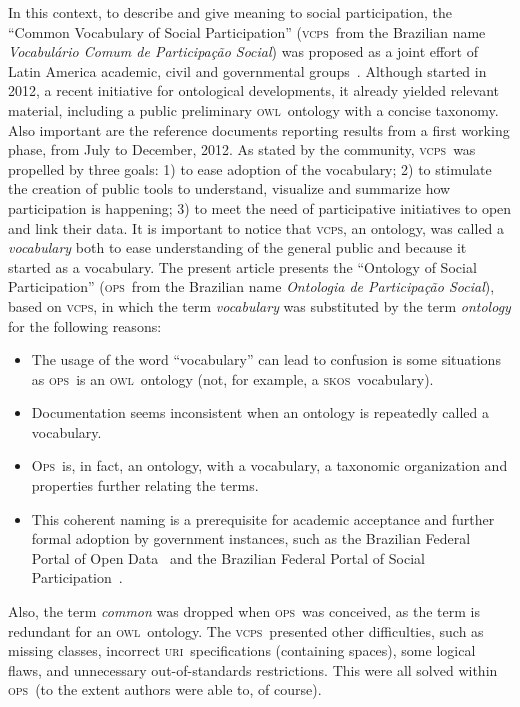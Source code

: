 \documentclass[10pt,letterpaper]{article}
\newcommand{\ops}{\textsc{ops}}
\newcommand{\opsi}{O\textsc{ps}}
\newcommand{\vcps}{\textsc{vcps}}
\newcommand{\owl}{\textsc{owl}}
\newcommand{\skos}{\textsc{skos}}
\newcommand{\uri}{\textsc{uri}}
\begin{document}
In this context, to describe and give meaning to social participation,
the ``Common Vocabulary of Social Participation''
(\vcps\ from the Brazilian name \emph{Vocabul\'ario Comum de Participa\c{c}\~ao Social})
was proposed as a joint effort of Latin America academic, civil and governmental groups~\cite{corais}.
Although started in 2012, a recent initiative for ontological developments,
it already yielded relevant material, including a public preliminary \owl\ ontology with a concise taxonomy.
Also important are the reference documents reporting results from a first working phase, from July to December, 2012. 
As stated by the community, \vcps\ was propelled by three goals:
1) to ease adoption of the vocabulary;
2) to stimulate the creation of public tools to understand, visualize and summarize how participation is happening;
3) to meet the need of participative initiatives to open and link their data. 
It is important to notice that \vcps,
an ontology, was called a \emph{vocabulary} both to ease understanding of the general public and because it started as a vocabulary.
The present article presents the ``Ontology of Social Participation'' 
(\ops\ from the Brazilian name \emph{Ontologia de Participa\c{c}\~ao Social}),
based on \vcps, in which the term \emph{vocabulary} was substituted by the term \emph{ontology} for the following reasons:
\begin{itemize}
    \item The usage of the word ``vocabulary'' can lead to confusion is some situations as \ops\ is an \owl\ ontology
    (not, for example, a \skos\ vocabulary).
    \item Documentation seems inconsistent when an ontology is repeatedly called a vocabulary.
    \item \opsi\ is, in fact, an ontology, with a vocabulary,
    a taxonomic organization and properties further relating the terms.
    \item This coherent naming is a prerequisite for academic acceptance and further formal adoption by government instances,
    such as the Brazilian Federal Portal of Open Data~\cite{dadosGov} and the Brazilian Federal Portal of Social Participation~\cite{participa}.
\end{itemize}

\noindent Also, the term \emph{common} was dropped when \ops\ was conceived,
as the term is redundant for an \owl\ ontology.
The \vcps\ presented other difficulties, such as missing classes,
incorrect \uri\ specifications (containing spaces), some logical flaws,
and unnecessary out-of-standards restrictions.
This were all solved within \ops\ (to the extent authors were able to, of course).
\end{document}

